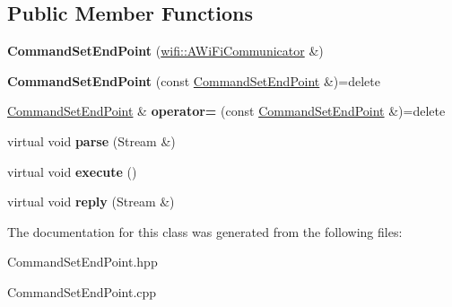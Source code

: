 \subsection*{Public Member Functions}
\begin{DoxyCompactItemize}
\item 
\mbox{\label{classwood_box_1_1communication_1_1commands_1_1_command_set_end_point_a52bd7a90eb7e4533d79a09c77940946e}} 
{\bfseries Command\+Set\+End\+Point} (\mbox{\hyperlink{classwood_box_1_1communication_1_1wifi_1_1_a_wi_fi_communicator}{wifi\+::\+A\+Wi\+Fi\+Communicator}} \&)
\item 
\mbox{\label{classwood_box_1_1communication_1_1commands_1_1_command_set_end_point_abd58a35add8c83a23d80fb8c3a1b6c7d}} 
{\bfseries Command\+Set\+End\+Point} (const \mbox{\hyperlink{classwood_box_1_1communication_1_1commands_1_1_command_set_end_point}{Command\+Set\+End\+Point}} \&)=delete
\item 
\mbox{\label{classwood_box_1_1communication_1_1commands_1_1_command_set_end_point_a71df3e4cede5be682d49856c8934baf3}} 
\mbox{\hyperlink{classwood_box_1_1communication_1_1commands_1_1_command_set_end_point}{Command\+Set\+End\+Point}} \& {\bfseries operator=} (const \mbox{\hyperlink{classwood_box_1_1communication_1_1commands_1_1_command_set_end_point}{Command\+Set\+End\+Point}} \&)=delete
\item 
\mbox{\label{classwood_box_1_1communication_1_1commands_1_1_command_set_end_point_ad11ea4ae0498b70c05b63cef652bc495}} 
virtual void {\bfseries parse} (Stream \&)
\item 
\mbox{\label{classwood_box_1_1communication_1_1commands_1_1_command_set_end_point_a36b3692b99c49c115b77396462e3cb3e}} 
virtual void {\bfseries execute} ()
\item 
\mbox{\label{classwood_box_1_1communication_1_1commands_1_1_command_set_end_point_a7088dc748dd916406028d1d875d6b708}} 
virtual void {\bfseries reply} (Stream \&)
\end{DoxyCompactItemize}


The documentation for this class was generated from the following files\+:\begin{DoxyCompactItemize}
\item 
Command\+Set\+End\+Point.\+hpp\item 
Command\+Set\+End\+Point.\+cpp\end{DoxyCompactItemize}
